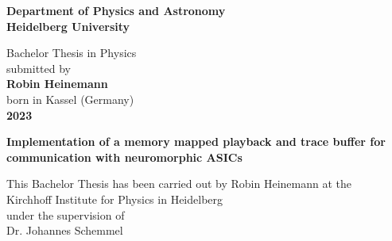 \begin{titlepage}
\begin{center}
 
\Large\textbf{Department of Physics and Astronomy\\
Heidelberg University}

\vspace{18cm}

\normalsize
Bachelor Thesis in Physics\\
submitted by\\
\vspace{0.5cm}
\Large\textbf{Robin Heinemann}\\
\normalsize
\vspace{0.5cm}
born in Kassel (Germany)\\
\vspace{0.5cm}
\Large\textbf{2023}
\normalsize

\newpage




\Large\textbf{Implementation of a memory mapped playback and trace buffer for communication with neuromorphic ASICs}

\vspace{18cm}

\normalsize
This Bachelor Thesis has been carried out by Robin Heinemann at the\\
Kirchhoff Institute for Physics in Heidelberg\\
under the supervision of\\
Dr. Johannes Schemmel

\vfill
\end{center}

\end{titlepage}
